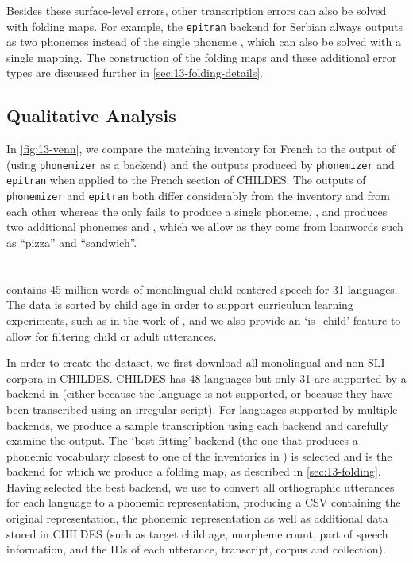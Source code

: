 Besides these surface-level errors, other transcription errors can also be solved with folding maps. For example, the \texttt{epitran} backend for Serbian always outputs  as two phonemes instead of the single phoneme , which can also be solved with a single mapping. The construction of the folding maps and these additional error types are discussed further in \cref{sec:13-folding-details}. 

\subsection{Qualitative Analysis}\label{sec:13-qualitative}

In \cref{fig:13-venn}, we compare the matching \phoible inventory for French to the output of \corpusphonemizer (using \texttt{phonemizer} as a backend) and the outputs produced by \texttt{phonemizer} and \texttt{epitran} when applied to the French section of CHILDES. The outputs of \texttt{phonemizer} and \texttt{epitran} both differ considerably from the inventory and from each other whereas the \corpusphonemizer only fails to produce a single phoneme, \ttipa{\textturnh}, and produces two additional phonemes  and , which we allow as they come from loanwords such as ``pizza'' and ``sandwich''. 

\section{\ipachildes}

\ipachildes contains 45 million words of monolingual child-centered speech for 31 languages. The data is sorted by child age in order to support curriculum learning experiments, such as in the work of \citet{huebner-etal-2021-babyberta}, and we also provide an `is\_child' feature to allow for filtering child or adult utterances.

In order to create the dataset, we first download all monolingual and non-SLI corpora in CHILDES. %
CHILDES has 48 languages but only 31 are supported by a backend in \corpusphonemizer (either because the language is not supported, or because they have been transcribed using an irregular script). For languages supported by multiple backends, we produce a sample transcription using each backend and carefully examine the output. The `best-fitting' backend (the one that produces a phonemic vocabulary closest to one of the inventories in \phoible) is selected and is the backend for which we produce a folding map, as described in \cref{sec:13-folding}. Having selected the best backend, we use \corpusphonemizer to convert all orthographic utterances for each language to a phonemic representation, producing a CSV containing the original representation, the phonemic representation as well as additional data stored in CHILDES (such as target child age, morpheme count, part of speech information, and the IDs of each utterance, transcript, corpus and collection). 

